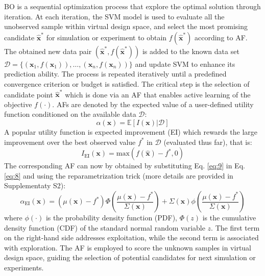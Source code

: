 \documentclass[preprint,review,12pt,authoryear]{elsarticle}
\begin{document}
BO is a sequential optimization process that explore the optimal solution through iteration. At each iteration, the SVM model is used to evaluate all the unobserved sample within virtual design space, and select the most promising candidate $\hat{\boldsymbol{x}}^*$ for simulation or experiment to obtain $f(\hat{\boldsymbol{x}}^*)$ according to AF. The obtained new data pair $(\hat{\boldsymbol{x}}^*, f(\hat{\boldsymbol{x}}^*))$ is added to the known data set $\mathcal{D} = \{(\boldsymbol{x}_1, f(\boldsymbol{x}_1)), \ldots, (\boldsymbol{x}_n, f(\boldsymbol{x}_n))\}$ and update SVM to enhance its prediction ability. The process is repeated iteratively until a predefined convergence criterion or budget is satisfied. The critical step is the selection of candidate point $\hat{\boldsymbol{x}}^*$ which is done via an AF that enables active learning of the objective $f(\cdot)$\citep{Settles2009ActiveLL}. AFs are denoted by the expected value of a user-defined utility function conditioned on the available data $\mathcal{D}$:
\begin{equation}
    \alpha(\boldsymbol{x}) = \mathbb{E}[I(\boldsymbol{x})|\mathcal{D}]
\label{eq:8}
\end{equation}
A popular utility function is expected improvement (EI) which rewards the large improvement over the best observed value $f^*$ in $\mathcal{D}$ (evaluated thus far), that is:
\begin{equation}
    I_\text{EI}(\boldsymbol{x})=\text{max}(f(\hat{\boldsymbol{x}})-f^*, 0)
    \label{eq:9}
\end{equation}
The corresponding AF can now by obtained by substituting Eq. \ref{eq:9} in Eq. \ref{eq:8} and using the reparametrization trick (more details are provided in Supplementaty S2):
\begin{equation}
\alpha_\text{EI}(\boldsymbol{x}) = \left(\mu(\boldsymbol{x}) - f^*\right) \Phi\left(\frac{\mu(\boldsymbol{x}) - f^*}{\Sigma(\boldsymbol{x})}\right) + \Sigma(\boldsymbol{x}) \phi\left(\frac{\mu(\boldsymbol{x}) - f^*}{\Sigma(\boldsymbol{x})}\right)
\label{eq:10}
\end{equation}
where $\phi(\cdot)$ is the probability density function (PDF), $\Phi(z)$ is the cumulative density function (CDF) of the standard normal random variable $z$.
The first term on the right-hand side addresses exploitation, while the second term is associated with exploration. The AF is employed to score the unknown samples in virtual design space, guiding the selection of potential candidates for next simulation or experiments.
\end{document}
